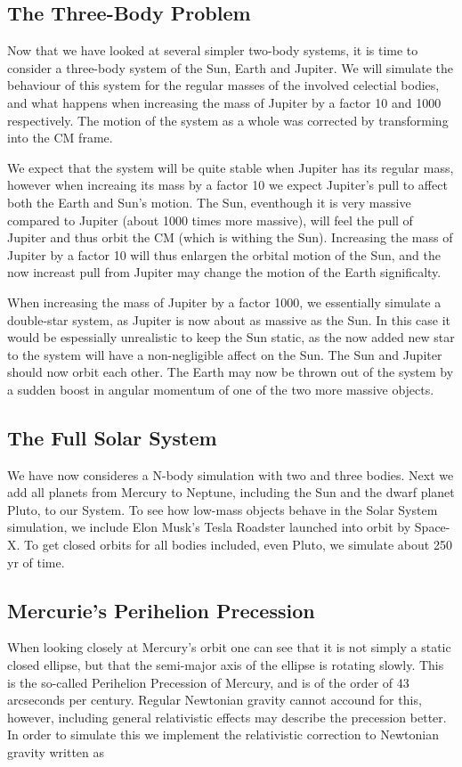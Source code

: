 \documentclass[twocolumn]{aastex62}
\begin{document}
\subsection{The Three-Body Problem} \label{subsec:three_body_prob}
Now that we have looked at several simpler two-body systems, it is time to
consider a three-body system of the Sun, Earth and Jupiter. We will simulate the
behaviour of this system for the regular masses of the involved celectial
bodies, and what happens when increasing the mass of Jupiter by a factor 10 and
1000 respectively. The motion of the system as a whole was corrected by
transforming into the CM frame.

We expect that the system will be quite stable when Jupiter has its regular
mass, however when increaing its mass by a factor 10 we expect Jupiter's pull to
affect both the Earth and Sun's motion. The Sun, eventhough it is very massive
compared to Jupiter (about 1000 times more massive), will feel the pull of
Jupiter and thus orbit the CM (which is withing the Sun). Increasing the mass of
Jupiter by a factor 10 will thus enlargen the orbital motion of the Sun, and the
now increast pull from Jupiter may change the motion of the Earth significalty. 

When increasing the mass of Jupiter by a factor 1000, we essentially simulate a
double-star system, as Jupiter is now about as massive as the Sun. In this case
it would be espessially unrealistic to keep the Sun static, as the now added new
star to the system will have a non-negligible affect on the Sun. The Sun and
Jupiter should now orbit each other. The Earth may now be thrown out of the
system by a sudden boost in angular momentum of one of the two more massive
objects. 


\subsection{The Full Solar System} \label{subsec:solar_system}
We have now consideres a N-body simulation with two and three bodies. Next we
add all planets from Mercury to Neptune, including the Sun and the dwarf planet
Pluto, to our System. To see how low-mass objects behave in the Solar System
simulation, we include Elon Musk's Tesla Roadster launched into orbit by
Space-X. To get closed orbits for all bodies included, even Pluto, we simulate
about 250 yr of time.

\subsection{Mercurie's Perihelion Precession}\label{sec:mercuryprecession}
When looking closely at Mercury's orbit one can see that it is not simply a
static closed ellipse, but that the semi-major axis of the ellipse is rotating
slowly. This is the so-called Perihelion Precession of Mercury, and is of the
order of 43 arcseconds per century. Regular Newtonian gravity cannot accound for
this, however, including general relativistic effects may describe the
precession better. In order to simulate this we implement the
relativistic correction to Newtonian gravity written as 
\end{document}
